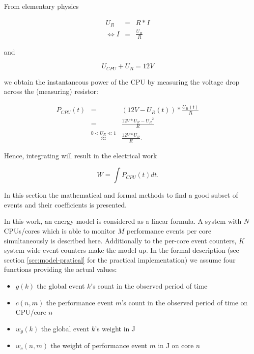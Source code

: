 \label{sec:calc-work}

From elementary physics

\begin{eqnarray}
     U_R & = & R * I \\
  \iff I & = & \frac{U_R}{R}
\end{eqnarray}

and

\begin{equation}
  U_{CPU} + U_{R} = 12 V
\end{equation}

we obtain the instantaneous power of the CPU by measuring the voltage drop
across the (measuring) resistor:

\begin{eqnarray}
P_{CPU}(t) & = & (12V - U_R(t)) * \frac{U_R(t)}{R} \\
           & = & \frac{12V * U_R - {U_R}^2}{R} \\
           & \stackrel{0 < U_R \ll 1}{\approx} & \frac{12V * U_R}{R}.
\end{eqnarray}

Hence, integrating will result in the electrical work

\begin{equation}
  W = \int P_{CPU}(t)dt.
\end{equation}


\label{sec:model}

In this section the mathematical and formal methods to find a good subset of
events and their coefficients is presented.

\label{sec:model-properties}

In this work, an energy model is considered as a linear formula. A system with
$N$ CPUs/cores which is able to monitor $M$ performance events per core
simultaneously is described here. Additionally to the per-core event counters,
$K$ system-wide event counters make the model up. In the formal description (see
section \ref{sec:model-pratical} for the practical implementation) we assume
four functions providing the actual values:

\begin{itemize}

\item $g(k)$ the global event $k$'s count in the observed period of time

\item $c(n, m)$ the performance event $m$'s count in the observed period of time
      on CPU/core $n$

\item $w_g(k)$ the global event $k$'s weight in \si{\joule}

\item $w_c(n, m)$ the weight of performance event $m$ in \si{\joule} on core
$n$

\end{itemize}

